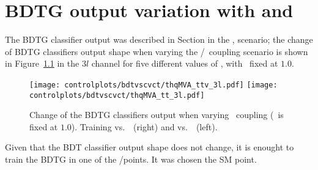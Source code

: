 \chapter{BDTG output variation with \CV and \Ct }\label{sec:bdtvscvct}

The BDTG classifier output was described in Section \label{secc:signal_disc} in the , scenario; the change of BDTG classifiers output shape when varying the \CV/\Ct\ coupling scenario is shown in Figure~\ref{fig:bdtvscvct} in the $3l$ channel for five different values of \Ct, with \CV\ fixed at $1.0$.
\begin{figure} [!h]
  \centering
  \texttt{[image: controlplots/bdtvscvct/thqMVA\_ttv\_3l.pdf]}
  \texttt{[image: controlplots/bdtvscvct/thqMVA\_tt\_3l.pdf]} \\
  \caption[BDTG output variation with \CV/\Ct]{Change of the BDTG classifiers output when varying \Ct\ coupling (\CV\ is fixed at $1.0$). Training vs.\ \ttV\ (right) and vs.\ \ttbar\ (left).}
  \label{fig:bdtvscvct}
\end{figure}

Given that the BDT classifier output shape does not change, it is enought to train the BDTG in one of the \Ct/\CV points. It was chosen the SM point.  

